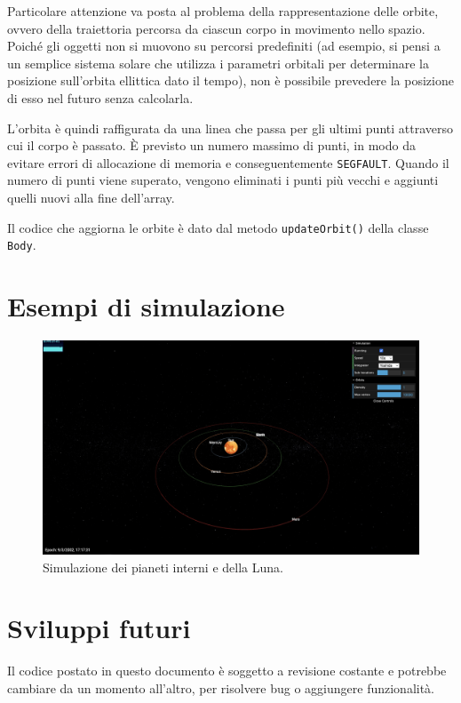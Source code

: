 \documentclass[11pt]{article}
\begin{document}
	Particolare attenzione va posta al problema della rappresentazione delle orbite, ovvero della traiettoria percorsa da ciascun corpo in movimento nello spazio. Poiché gli oggetti non si muovono su percorsi predefiniti (ad esempio, si pensi a un semplice sistema solare che utilizza i parametri orbitali per determinare la posizione sull'orbita ellittica dato il tempo), non è possibile prevedere la posizione di esso nel futuro senza calcolarla.

	L'orbita è quindi raffigurata da una linea che passa per gli ultimi punti attraverso cui il corpo è passato. È previsto un numero massimo di punti, in modo da evitare errori di allocazione di memoria e conseguentemente \texttt{SEGFAULT}. Quando il numero di punti viene superato, vengono eliminati i punti più vecchi e aggiunti quelli nuovi alla fine dell'array.

	Il codice che aggiorna le orbite è dato dal metodo \texttt{updateOrbit()} della classe \texttt{Body}.

	\section{Esempi di simulazione}

	\begin{figure}[htp]
		\centering
		\includegraphics[width=\linewidth]{simulation_inner_planets.jpg}
		\caption{Simulazione dei pianeti interni e della Luna.}
	\end{figure}

	\section{Sviluppi futuri}

	Il codice postato in questo documento è soggetto a revisione costante e potrebbe cambiare da un momento all'altro, per risolvere bug o aggiungere funzionalità.
\end{document}
